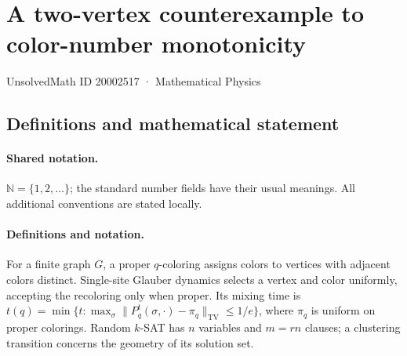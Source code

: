 \documentclass[11pt]{article}
\begin{document}
\setcounter{section}{20002516}
\section{A two-vertex counterexample to color-number monotonicity}\label{20002517}
{\small UnsolvedMath ID 20002517 · Mathematical Physics}
\subsection{Definitions and mathematical statement}

\paragraph{Shared notation.}$\mathbb N=\{1,2,\ldots\}$; the standard number fields have their usual meanings. All additional conventions are stated locally.


\paragraph{Definitions and notation.}For a finite graph $G$, a proper $q$-coloring assigns colors to vertices with adjacent colors distinct. Single-site Glauber dynamics selects a vertex and color uniformly, accepting the recoloring only when proper. Its mixing time is $t(q)=\min\{t:\max_\sigma\|P_q^t(\sigma,\cdot)-\pi_q\|_{\mathrm{TV}}\le1/e\}$, where $\pi_q$ is uniform on proper colorings. Random $k$-SAT has $n$ variables and $m=rn$ clauses; a clustering transition concerns the geometry of its solution set.
\end{document}
